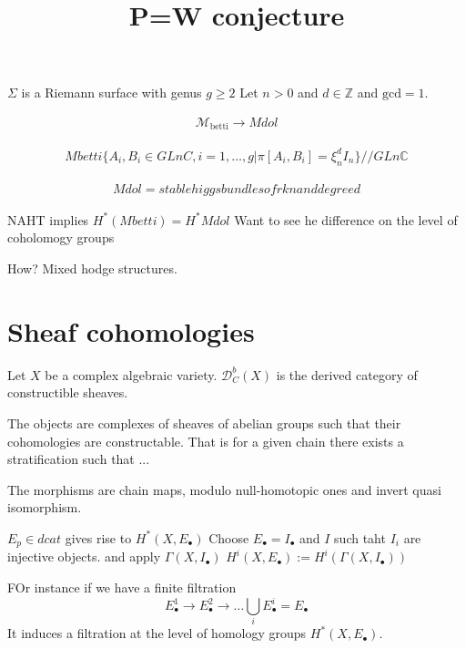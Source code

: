 
% 



\title{P=W conjecture}
\author{}
\date{}

 
\maketitle

$\Sigma$ is a Riemann surface with genus $g \geq 2 $ 
Let $ n >0 $ and $ d \in \mathbb{Z} $ and $ \mathrm{gcd} =1 $. 

\begin{align}
    \mathcal{M}_{\mathrm{betti}} \rightarrow  Mdol
\end{align}

\begin{align}
    Mbetti \{ A_i, B_i \in GLnC , i = 1, \dots, g | \pi[A_i, B_i ] = \xi ^d_n I_n \} // GLn\mathbb{C} 
\end{align}

\begin{align}
    Mdol = stable higgs bundles of rk n and degree d 
\end{align}

NAHT implies 
$ H^* ( Mbetti) = H^* Mdol$ 
Want to see he difference on the level of coholomogy groups

How? Mixed hodge structures. 

\section{Sheaf cohomologies} %

\begin{definition}
Let $X$ be a complex algebraic variety. 
    $\mathcal{D} _{C}  ^b (X) $ is the derived category of constructible sheaves. 

    The objects are complexes of sheaves of abelian groups 
    such that their cohomologies are constructable. 
    That is for a given chain there exists a stratification such that ...


    The morphisms are chain maps, modulo null-homotopic ones and invert quasi isomorphism. 
\end{definition}

$ E_p \in dcat $ gives rise to $ H ^* ( X, E_\bullet ) $ 
Choose $ E_\bullet = I _\bullet $ 
and $I$ such taht $ I_i $ are injective objects. 
and apply $\Gamma ( X, I_\bullet) $ 
$ H ^i ( X, E_\bullet ) := H^i ( \Gamma ( X, I_\bullet) ) $ 

FOr instance if we have a finite filtration 
\begin{equation}
    E_\bullet ^{1} \rightarrow     
    E_\bullet ^{2} \rightarrow     
    \dots 
    \bigcup_ i E_\bullet ^{i}  = E_\bullet 
\end{equation}
It induces a filtration at the level of homology groups $H^* ( X, E_\bullet) $. 

